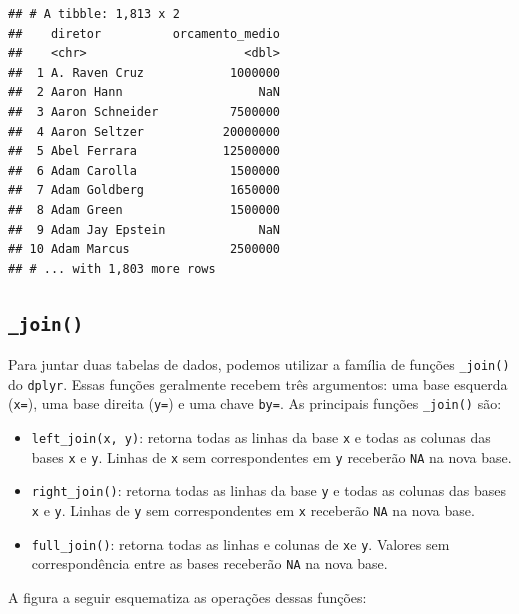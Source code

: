 \documentclass[
]{book}
\providecommand{\tightlist}{%
  \setlength{\itemsep}{0pt}\setlength{\parskip}{0pt}}
\begin{document}
\begin{verbatim}
## # A tibble: 1,813 x 2
##    diretor          orcamento_medio
##    <chr>                      <dbl>
##  1 A. Raven Cruz            1000000
##  2 Aaron Hann                   NaN
##  3 Aaron Schneider          7500000
##  4 Aaron Seltzer           20000000
##  5 Abel Ferrara            12500000
##  6 Adam Carolla             1500000
##  7 Adam Goldberg            1650000
##  8 Adam Green               1500000
##  9 Adam Jay Epstein             NaN
## 10 Adam Marcus              2500000
## # ... with 1,803 more rows
\end{verbatim}

\hypertarget{join}{%
\subsection{\texorpdfstring{\texttt{\_join()}}{\_join()}}\label{join}}

Para juntar duas tabelas de dados, podemos utilizar a família de funções \texttt{\_join()} do \texttt{dplyr}. Essas funções geralmente recebem três argumentos: uma base esquerda (\texttt{x=}), uma base direita (\texttt{y=}) e uma chave \texttt{by=}. As principais funções \texttt{\_join()} são:

\begin{itemize}
\tightlist
\item
  \texttt{left\_join(x,\ y)}: retorna todas as linhas da base \texttt{x} e todas as colunas das bases \texttt{x} e \texttt{y}. Linhas de \texttt{x} sem correspondentes em \texttt{y} receberão \texttt{NA} na nova base.
\item
  \texttt{right\_join()}: retorna todas as linhas da base \texttt{y} e todas as colunas das bases \texttt{x} e \texttt{y}. Linhas de \texttt{y} sem correspondentes em \texttt{x} receberão \texttt{NA} na nova base.
\item
  \texttt{full\_join()}: retorna todas as linhas e colunas de \texttt{x}e \texttt{y}. Valores sem correspondência entre as bases receberão \texttt{NA} na nova base.
\end{itemize}

A figura a seguir esquematiza as operações dessas funções:
\end{document}

